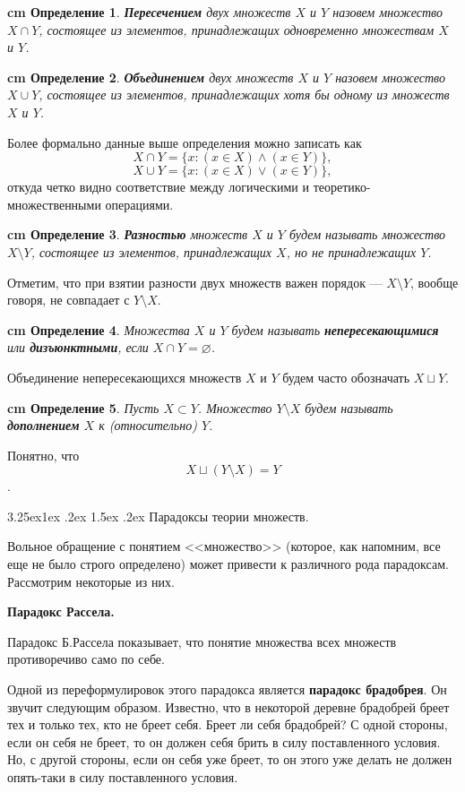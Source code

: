 \documentclass[12pt, russian]{article}
\makeatletter
\renewcommand\subsubsection{\@startsection{subsubsection}{3}{\parindent}%
	{3.25ex\@plus 1ex \@minus .2ex}%
	{1.5ex \@plus .2ex}%
	{\normalfont\large\bfseries}}
\newtheorem{definition}{\hskip 0.5 cm Определение}%
\makeatother
\begin{document}
\begin{definition}
	\textbf{Пересечением} двух множеств $X$ и $Y$ назовем множество $X \cap Y$, состоящее из элементов, принадлежащих одновременно множествам $X$ и $Y$.
\end{definition}
\begin{definition}
	\textbf{Объединением} двух множеств $X$ и $Y$ назовем множество $X \cup Y$, состоящее из элементов, принадлежащих хотя бы одному из множеств $X$ и $Y$.
\end{definition}
Более формально данные выше определения можно записать как
$$
X \cap Y = \{ x:  (x \in X) \wedge (x \in Y) \},
$$
$$
X \cup Y = \{ x:  (x \in X) \vee (x \in Y) \},
$$
откуда четко видно соответствие между логическими и теоретико-множественными операциями.
\begin{definition}
	\textbf{Разностью} множеств $X$ и $Y$ будем называть множество $X \setminus Y$, состоящее из элементов, принадлежащих $X$, но не принадлежащих $Y$.
\end{definition}
Отметим, что при взятии разности двух множеств важен порядок --- $X\setminus Y$, вообще говоря, не совпадает с $Y \setminus X$.
\begin{definition}
	Множества $X$ и $Y$ будем называть \textbf{непересекающимися} или \textbf{дизъюнктными}, если $X \cap Y = \varnothing$.
\end{definition}
Объединение непересекающихся множеств $X$ и $Y$ будем часто обозначать $X \sqcup Y$.
\begin{definition}
	Пусть $X \subset Y$. Множество $Y \setminus X$ будем называть \textbf{дополнением } $X$ к (относительно) $Y$.
\end{definition}
Понятно, что $$X \sqcup (Y \setminus X) = Y$$.


\subsubsection{Парадоксы теории множеств.}

Вольное обращение с понятием <<множество>> (которое, как напомним, все еще не было строго определено) может привести к различного рода парадоксам. Рассмотрим некоторые из них.

\textbf{Парадокс Рассела.}

Парадокс Б.Рассела показывает, что понятие множества всех множеств противоречиво само по себе.

Одной из переформулировок этого парадокса является \textbf{парадокс брадобрея}. Он звучит следующим образом. Известно, что в некоторой деревне брадобрей бреет тех и только тех, кто не бреет себя. Бреет ли себя брадобрей? С одной стороны, если он себя не бреет, то он должен себя брить в силу поставленного условия. Но, с другой стороны, если он себя уже бреет, то он этого уже делать не должен опять-таки в силу поставленного условия.
\end{document}
